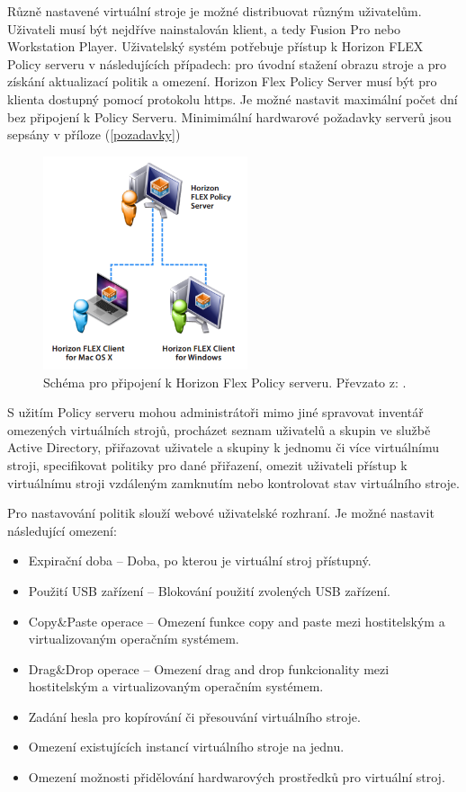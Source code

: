 Různě nastavené virtuální stroje je možné distribuovat různým uživatelům. Uživateli musí být nejdříve nainstalován klient, a tedy Fusion Pro nebo Workstation Player. Uživatelský systém potřebuje přístup k Horizon FLEX Policy serveru v následujících případech: pro úvodní stažení obrazu stroje a pro získání aktualizací politik a omezení. Horizon Flex Policy Server musí být pro klienta dostupný pomocí protokolu https. Je možné nastavit maximální počet dní bez připojení k Policy Serveru. Minimimální hardwarové požadavky serverů jsou sepsány v příloze (\ref{pozadavky})


 \begin{figure}[h!]\label{FlexPolicy}
 \centering
\includegraphics[width=6cm]{img/FlexPolicy}
\caption{Schéma pro připojení k Horizon Flex Policy serveru. Převzato z: \cite{FlexBrief}.}
\end{figure}


S užitím Policy serveru mohou administrátoři mimo jiné spravovat inventář omezených virtuálních strojů, procházet seznam uživatelů a skupin ve službě Active Directory, přiřazovat uživatele a skupiny k jednomu či více virtuálnímu stroji, specifikovat politiky pro dané přiřazení, omezit uživateli přístup k virtuálnímu stroji vzdáleným zamknutím nebo kontrolovat stav virtuálního stroje.

Pro nastavování politik slouží webové uživatelské rozhraní. Je možné nastavit následující omezení:

\begin{itemize}
    \item Expirační doba -- Doba, po kterou je virtuální stroj přístupný.
    \item Použití USB zařízení -- Blokování použití zvolených USB zařízení.
    \item Copy\&Paste operace -- Omezení funkce copy and paste mezi hostitelským a virtualizovaným operačním systémem.
    \item Drag\&Drop operace -- Omezení drag and drop funkcionality mezi hostitelským a virtualizovaným operačním systémem.
    \item Zadání hesla pro kopírování či přesouvání virtuálního stroje.
    \item Omezení existujících instancí virtuálního stroje na jednu.
    \item Omezení možnosti přidělování hardwarových prostředků pro virtuální stroj.
\end{itemize}

